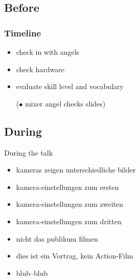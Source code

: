 \documentclass[hyperref={pdfpagelabels=false}]{beamer}
\begin{document}
\subsection{Before}
\begin{frame}
\frametitle{Timeline}
\begin{itemize}[<+->]
\item check in with angels %
\item check hardware %
\item evaluate skill level and vocabulary %
\item [($\bullet$ ] mixer angel checks slides) %
\end{itemize} 
\end{frame}


\subsection{During} %
\begin{frame}{During the talk}
\begin{itemize}
\item  kameras zeigen unterschiedliche bilder 
\item  kamera-einstellungen zum ersten
\item  kamera-einstellungen zum zweiten
\item  kamera-einstellungen zum dritten
\item  nicht das publikum filmen
\item  dies ist ein Vortrag, kein Action-Film 
\item  blub--blub
\end{itemize} 
\end{frame}
\end{document}
